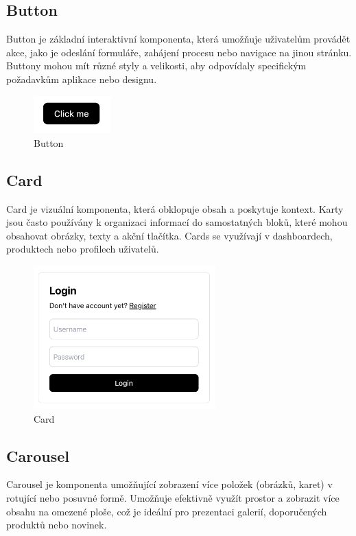 \subsection{Button}
Button je základní interaktivní komponenta, která umožňuje uživatelům provádět akce, jako je odeslání formuláře, zahájení procesu nebo navigace na jinou stránku. Buttony mohou mít různé styly a velikosti, aby odpovídaly specifickým požadavkům aplikace nebo designu.

\begin{figure}[H]
  \centering
  \includegraphics[width=3cm]{images/button}
  \captionsetup{justification=centering,margin=2cm}
  \caption{Button} \label{picture:button}
\end{figure}

\subsection{Card}
Card je vizuální komponenta, která obklopuje obsah a poskytuje kontext. Karty jsou často používány k organizaci informací do samostatných bloků, které mohou obsahovat obrázky, texty a akční tlačítka. Cards se využívají v dashboardech, produktech nebo profilech uživatelů.

\begin{figure}[H]
  \centering
  \includegraphics[width=7cm]{images/card}
  \captionsetup{justification=centering,margin=2cm}
  \caption{Card} \label{picture:card}
\end{figure}

\subsection{Carousel}
Carousel je komponenta umožňující zobrazení více položek (obrázků, karet) v rotující nebo posuvné formě. Umožňuje efektivně využít prostor a zobrazit více obsahu na omezené ploše, což je ideální pro prezentaci galerií, doporučených produktů nebo novinek.

